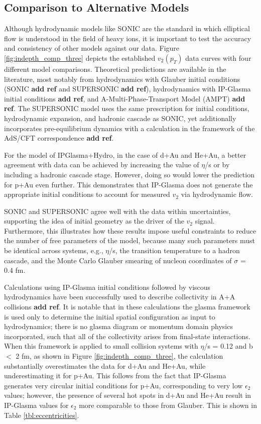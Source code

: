 \subsection{Comparison to Alternative Models}
Although hydrodynamic models like SONIC are the standard in which elliptical flow is understood in the field of heavy ions, it is important to test the accuracy and consistency of other models against our data. Figure \ref{fig:indepth_comp_three} depicts the established $v_2(p_T)$ data curves with four different model comparisons. Theoretical predictions are
 available in the literature, most notably from hydrodynamics with Glauber initial conditions (SONIC \textbf{add ref} and SUPERSONIC \textbf{add ref}), hydrodynamics with IP-Glasma initial conditions \textbf{add ref}, and A-Multi-Phase-Transport Model (AMPT) \textbf{add ref}.
 The SUPERSONIC model uses the same prescription for initial conditions, hydrodynamic expansion, and hadronic
 cascade as SONIC, yet additionally incorporates pre-equilibrium dynamics with a calculation in the framework of the
 AdS/CFT correspondence \textbf{add ref}.

For the model of IPGlasma+Hydro, in the case of d+Au and He+Au, a better agreement with data can be achieved by increasing the value of $\eta$/s or
by including a hadronic cascade stage. However, doing so would lower the prediction for p+Au even further. This demonstrates that IP-Glasma does not generate the appropriate initial conditions to account for measured $v_2$ via hydrodynamic flow.

 SONIC and SUPERSONIC agree well with the data within uncertainties, supporting the
 idea of initial geometry as the driver of the $v_2$ signal. Furthermore, this illustrates how these results impose useful
 constraints to reduce the number of free parameters of the model, because many such parameters must be identical
 across systems, e.g., $\eta$/s, the transition temperature to a hadron cascade, and the Monte Carlo Glauber smearing of
 nucleon coordinates of $\sigma$ = 0.4 fm.

 Calculations using IP-Glasma initial conditions followed by viscous hydrodynamics have been successfully used to
 describe collectivity in A+A collisions \textbf{add ref}. It is notable that in these calculations the glasma framework is used only
 to determine the initial spatial configuration as input to hydrodynamics; there is no glasma diagram or momentum
 domain physics incorporated, such that all of the collectivity arises from final-state interactions. When this framework
is applied to small collision systems with $\eta$/s = 0.12 and b $<$ 2 fm, as shown in Figure \ref{fig:indepth_comp_three}, the calculation substantially
overestimates the data for d+Au and He+Au, while underestimating it for p+Au. This follows from the fact that
 IP-Glasma generates very circular initial conditions for p+Au, corresponding to very low $\epsilon_2$ values; however, the
presence of several hot spots in d+Au and He+Au result in IP-Glasma values for $\epsilon_2$ more comparable to those from
 Glauber. This is shown in Table \ref{tbl:eccentricities}.


